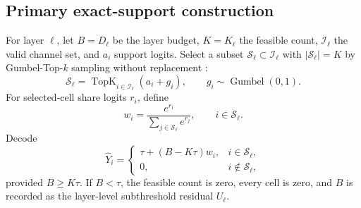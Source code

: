 \documentclass[11pt]{article}
\theoremstyle{definition}
\theoremstyle{remark}
\begin{document}
\subsection{Primary exact-support construction}
For layer $\ell$, let $B=D_\ell$ be the layer budget, $K=K_\ell$ the feasible count, $\mathcal I_\ell$ the valid channel set, and $a_i$ support logits. Select a subset $\mathcal S_\ell\subset\mathcal I_\ell$ with $|\mathcal S_\ell|=K$ by Gumbel-Top-$k$ sampling without replacement \citep{gumbeltopk}:
\begin{equation}
  \mathcal S_\ell=\operatorname{TopK}_{i\in\mathcal I_\ell}(a_i+g_i),
  \qquad g_i\sim\operatorname{Gumbel}(0,1).
  \label{eq:gumbel_topk}
\end{equation}
For selected-cell share logits $r_i$, define
\begin{equation}
  w_i=\frac{e^{r_i}}{\sum_{j\in\mathcal S_\ell}e^{r_j}},
  \qquad i\in\mathcal S_\ell.
\end{equation}
Decode
\begin{equation}
  \widehat Y_i=
  \begin{cases}
  \tau+(B-K\tau)w_i,&i\in\mathcal S_\ell,\\
  0,&i\notin\mathcal S_\ell,
  \end{cases}
  \label{eq:antidust_decoder}
\end{equation}
provided $B\ge K\tau$. If $B<\tau$, the feasible count is zero, every cell is zero, and $B$ is recorded as the layer-level subthreshold residual $U_\ell$.
\end{document}
